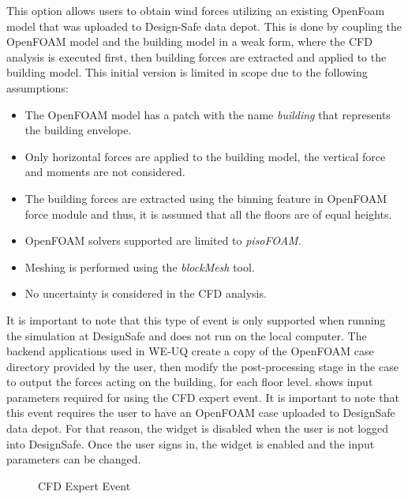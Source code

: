 This option allows users to obtain wind forces utilizing an existing OpenFoam model 
that was uploaded to Design-Safe data depot. 
This is done by coupling the OpenFOAM model and the building model in a weak form, 
where the CFD analysis is executed first, then building forces are extracted and applied to the building model.
This initial version is limited in scope due to the following assumptions:

\begin{itemize}
    \item The OpenFOAM model has a patch with the name \textit{building} that represents the building envelope.
    \item Only horizontal forces are applied to the building model, the vertical force and moments are not considered.
    \item The building forces are extracted using the binning feature in OpenFOAM force module and thus, it is
          assumed that all the floors are of equal heights.
    \item OpenFOAM solvers supported are limited to \textit{pisoFOAM}.
    \item Meshing is performed using the \textit{blockMesh} tool.
    \item No uncertainty is considered in the CFD analysis.
\end{itemize}

It is important to note that this type of event is only supported when running the simulation at DesignSafe and 
does not run on the local computer.
The backend applications used in WE-UQ create a copy of the OpenFOAM case directory provided by the user,
then modify the post-processing stage in the case to output the forces acting on the building, for each floor level.
 shows input parameters required for using the CFD expert event. It is important to note
that this event requires the user to have an OpenFOAM case uploaded to DesignSafe data depot. For that reason, 
the widget is disabled when the user is not logged into DesignSafe. Once the user signs in, the widget is enabled
and the input parameters can be changed. 

\begin{figure}[!htbp]
    \caption{CFD Expert Event}
    \label{fig:cfd_expert}
\end{figure}

